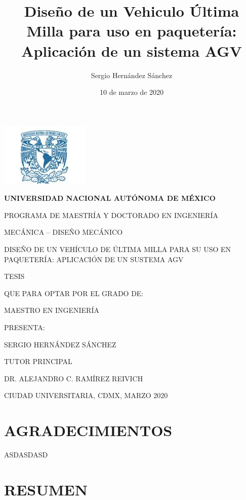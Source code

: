 \documentclass[12pt,letterpaper]{book}
\author{Sergio Hernández Sánchez}
\title{Diseño de un Vehiculo Última Milla para uso en paquetería: Aplicación de un sistema AGV}
\date{10 de marzo de 2020}
\begin{document}
\begin{titlepage}
\begin{center}
\includegraphics[scale=1]{Figures/Logo_azul.png}\\
\vspace*{2\baselineskip}
\begin{large}
\textbf{UNIVERSIDAD NACIONAL AUTÓNOMA DE MÉXICO}
\end{large}

PROGRAMA DE MAESTRÍA Y DOCTORADO EN INGENIERÍA

MECÁNICA – DISEÑO MECÁNICO

\vspace*{7\baselineskip}

DISEÑO DE UN VEHÍCULO DE ÚLTIMA MILLA PARA SU USO EN PAQUETERÍA: APLICACIÓN DE UN SUSTEMA AGV

\vspace*{4\baselineskip}

TESIS

QUE PARA OPTAR POR EL GRADO DE:

MAESTRO EN INGENIERÍA

\vspace*{5\baselineskip}

PRESENTA:

SERGIO HERNÁNDEZ SÁNCHEZ

\vspace*{4\baselineskip}

TUTOR PRINCIPAL

DR. ALEJANDRO C. RAMÍREZ REIVICH

\vspace*{4\baselineskip}

CIUDAD UNIVERSITARIA, CDMX, MARZO 2020

\end{center}
\end{titlepage}

\chapter*{AGRADECIMIENTOS}

ASDASDASD
\newpage

\chapter*{RESUMEN}
\end{document}
